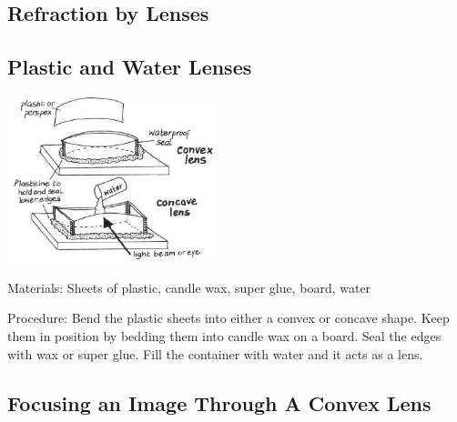 \begin{multicols}{2}

\section*{Refraction by Lenses} 


\subsection{Plastic and Water Lenses}

\begin{center}
\includegraphics[width=0.45\textwidth]{./img/vso/lenses.jpg}
\end{center}

\begin{description*}
\item[Materials:]{Sheets of plastic, candle wax, super glue, board, water}
\item[Procedure:]{Bend the plastic sheets into either a convex or concave shape. Keep them in position by bedding them into candle wax on a board. Seal the edges with wax or super glue. Fill the container with water and it acts as a lens.}
\end{description*}

\subsection{Focusing an Image Through A Convex Lens}


\end{multicols}
